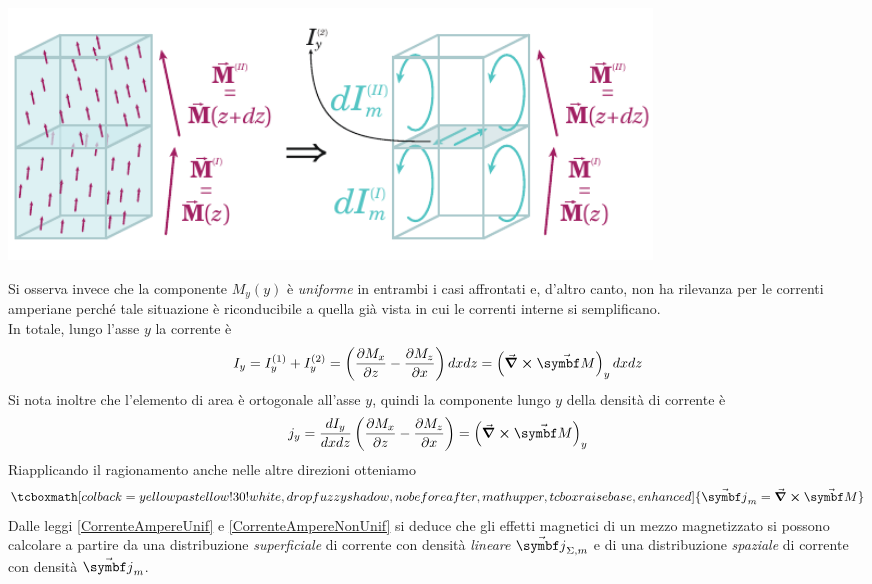 \begin{center}
	\includegraphics[width=0.75\textwidth]{images/chp12/chp12momento5.pdf}
\end{center}
Si osserva invece che la componente $M_y(y)$ è \textit{uniforme} in entrambi i casi affrontati e, d'altro canto, non ha rilevanza per le correnti amperiane perché tale situazione è riconducibile a quella già vista in cui le correnti interne si semplificano.\\
In totale, lungo l'asse $y$ la corrente è
\begin{equation}
	I_y=I_y^{(1)}+I_y^{(2)}=\left(\pdv{M_x}{z}-\pdv{M_z}{x}\right)dxdz=\left(\curl{\vba{M}}\right)_ydxdz
\end{equation}
Si nota inoltre che l'elemento di area è ortogonale all'asse $y$, quindi la componente lungo $y$ della densità di corrente è
\begin{equation*}
	j_y=\frac{dI_y}{dxdz}\left(\pdv{M_x}{z}-\pdv{M_z}{x}\right)=\left(\curl{\vba{M}}\right)_y
\end{equation*}
Riapplicando il ragionamento anche nelle altre direzioni otteniamo
\begin{equation}
		\tcboxmath[colback=yellowpastellow!30!white,drop fuzzy shadow, nobeforeafter, math upper, tcbox raise base, enhanced]{\vba{j}_m=\curl{\vba{M}}}\label{CorrenteAmpereNonUnif}
\end{equation}
Dalle leggi \eqref{CorrenteAmpereUnif} e \eqref{CorrenteAmpereNonUnif} si deduce che gli effetti magnetici di un mezzo magnetizzato si possono calcolare a partire da una distribuzione \textit{superficiale} di corrente con densità \textit{lineare} $\vba{j}_{\Sigma, m}$ e di una distribuzione \textit{spaziale} di corrente con densità $\vba{j}_m$.
